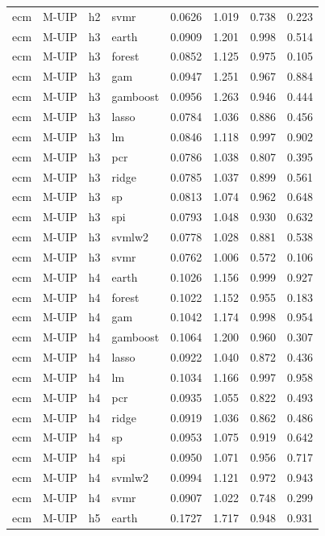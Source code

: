 \begin{ThreePartTable}
\begin{longtable}[t]{llclcccc}
ecm & M-UIP & h2 & svmr & 0.0626 & 1.019 & 0.738 & 0.223\\
\addlinespace
ecm & M-UIP & h3 & earth & 0.0909 & 1.201 & 0.998 & 0.514\\
ecm & M-UIP & h3 & forest & 0.0852 & 1.125 & 0.975 & 0.105\\
ecm & M-UIP & h3 & gam & 0.0947 & 1.251 & 0.967 & 0.884\\
ecm & M-UIP & h3 & gamboost & 0.0956 & 1.263 & 0.946 & 0.444\\
ecm & M-UIP & h3 & lasso & 0.0784 & 1.036 & 0.886 & 0.456\\
ecm & M-UIP & h3 & lm & 0.0846 & 1.118 & 0.997 & 0.902\\
ecm & M-UIP & h3 & pcr & 0.0786 & 1.038 & 0.807 & 0.395\\
ecm & M-UIP & h3 & ridge & 0.0785 & 1.037 & 0.899 & 0.561\\
ecm & M-UIP & h3 & sp & 0.0813 & 1.074 & 0.962 & 0.648\\
ecm & M-UIP & h3 & spi & 0.0793 & 1.048 & 0.930 & 0.632\\
ecm & M-UIP & h3 & svmlw2 & 0.0778 & 1.028 & 0.881 & 0.538\\
ecm & M-UIP & h3 & svmr & 0.0762 & 1.006 & 0.572 & 0.106\\
\addlinespace
ecm & M-UIP & h4 & earth & 0.1026 & 1.156 & 0.999 & 0.927\\
ecm & M-UIP & h4 & forest & 0.1022 & 1.152 & 0.955 & 0.183\\
ecm & M-UIP & h4 & gam & 0.1042 & 1.174 & 0.998 & 0.954\\
ecm & M-UIP & h4 & gamboost & 0.1064 & 1.200 & 0.960 & 0.307\\
ecm & M-UIP & h4 & lasso & 0.0922 & 1.040 & 0.872 & 0.436\\
ecm & M-UIP & h4 & lm & 0.1034 & 1.166 & 0.997 & 0.958\\
ecm & M-UIP & h4 & pcr & 0.0935 & 1.055 & 0.822 & 0.493\\
ecm & M-UIP & h4 & ridge & 0.0919 & 1.036 & 0.862 & 0.486\\
ecm & M-UIP & h4 & sp & 0.0953 & 1.075 & 0.919 & 0.642\\
ecm & M-UIP & h4 & spi & 0.0950 & 1.071 & 0.956 & 0.717\\
ecm & M-UIP & h4 & svmlw2 & 0.0994 & 1.121 & 0.972 & 0.943\\
ecm & M-UIP & h4 & svmr & 0.0907 & 1.022 & 0.748 & 0.299\\
\addlinespace
ecm & M-UIP & h5 & earth & 0.1727 & 1.717 & 0.948 & 0.931\\

\end{longtable}
\end{ThreePartTable}
